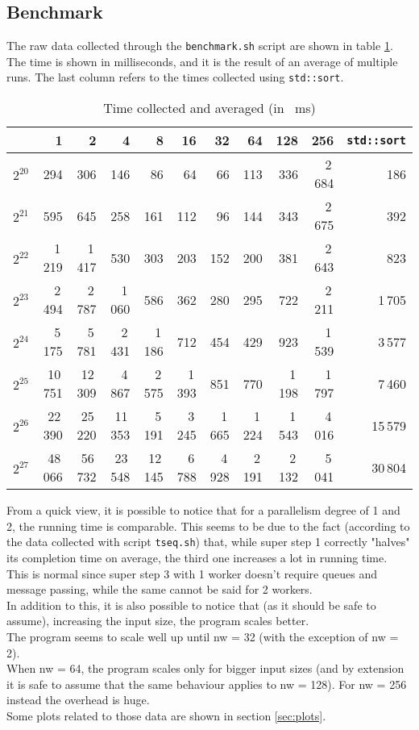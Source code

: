 \documentclass[]{article}
\def\code#1{\texttt{#1}}
\begin{document}
\subsection{Benchmark}
\label{sec:benchmark}
The raw data collected through the \code{benchmark.sh} script are shown in table \ref{tab:benchmark}. The time is shown in milliseconds, and it is the result of an average of multiple runs. The last column refers to the times collected using \code{std::sort}.
\begin{table}[H]
	\centering
	\begin{tabular}{l|*{10}r}
		\toprule
		\diagbox{$n$}{$\mathit{nw}$} 
		& 1 & 2 & 4 & 8 & 16 & 32 & 64 & 128 & 256 & \code{std::sort} \\
		\midrule
		$2^{20}$ & 294 & 306 & 146 & 86 & 64 & 66 & 113 & 336 & 2\,684 & 186 \\
		$2^{21}$ & 595 & 645 & 258 & 161 & 112 & 96 & 144 & 343  & 2\,675 & 392 \\
		$2^{22}$ & 1\,219 & 1\,417 & 530 & 303 & 203 & 152 & 200  & 381 & 2\,643 & 823 \\
		$2^{23}$ & 2\,494 & 2\,787 & 1\,060 & 586 & 362 & 280 & 295 & 722 & 2\,211  & 1\,705 \\
		$2^{24}$ & 5\,175 & 5\,781 & 2\,431 & 1\,186 & 712 & 454 & 429 & 923 & 1\,539 & 3\,577 \\
		$2^{25}$ & 10\,751 & 12\,309 & 4\,867 & 2\,575 & 1\,393 & 851 & 770 & 1\,198 & 1\,797 & 7\,460 \\
		$2^{26}$ & 22\,390 & 25\,220 & 11\,353 & 5\,191& 3\,245 & 1\,665 & 1\,224 & 1\,543 & 4\,016 & 15\,579 \\
		$2^{27}$ & 48\,066 & 56\,732 & 23\,548 & 12\,145 & 6\,788 & 4\,928 & 2\,191 & 2\,132 & 5\,041 & 30\,804 \\
		
		\bottomrule
	\end{tabular}%
	\caption{Time collected and averaged (in \SI{}{\milli \second})}
	\label{tab:benchmark}
\end{table}%
From a quick view, it is possible to notice that for a parallelism degree of 1 and 2, the running time is comparable. This seems to be due to the fact (according to the data collected with script \code{tseq.sh}) that, while super step 1 correctly "halves" its completion time on average, the third one increases a lot in running time. This is normal since super step 3 with 1 worker doesn't require queues and message passing, while the same cannot be said for 2 workers. \\
In addition to this, it is also possible to notice that (as it should be safe to assume), increasing the input size, the program scales better. \\
The program seems to scale well up until nw = 32 (with the exception of nw = 2). \\
When nw = 64, the program scales only for bigger input sizes (and by extension it is safe to assume that the same behaviour applies to nw = 128). For nw = 256 instead the overhead is huge. \\
Some plots related to those data are shown in section \ref{sec:plots}.
\end{document}
